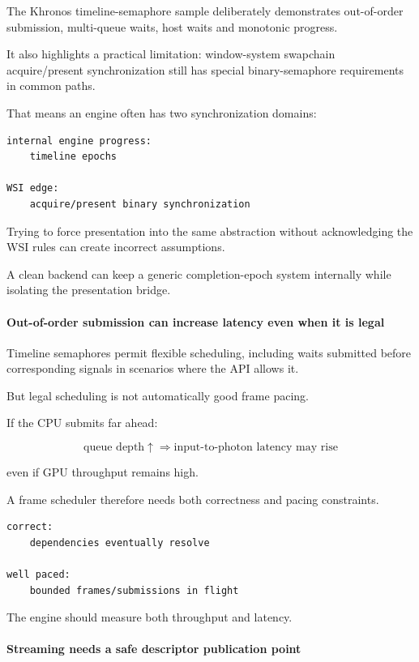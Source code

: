 The Khronos timeline-semaphore sample deliberately demonstrates out-of-order submission, multi-queue waits, host waits and monotonic progress.

It also highlights a practical limitation: window-system swapchain acquire/present synchronization still has special binary-semaphore requirements in common paths.

That means an engine often has two synchronization domains:

\begin{verbatim}
internal engine progress:
    timeline epochs

WSI edge:
    acquire/present binary synchronization
\end{verbatim}

Trying to force presentation into the same abstraction without acknowledging the WSI rules can create incorrect assumptions.

A clean backend can keep a generic completion-epoch system internally while isolating the presentation bridge.

\paragraph{Out-of-order submission can increase latency even when it is legal}\label{out-of-order-submission-can-increase-latency-even-when-it-is-legal}

Timeline semaphores permit flexible scheduling, including waits submitted before corresponding signals in scenarios where the API allows it.

But legal scheduling is not automatically good frame pacing.

If the CPU submits far ahead:

\[
\text{queue depth}\uparrow
\Rightarrow
\text{input-to-photon latency may rise}
\]

even if GPU throughput remains high.

A frame scheduler therefore needs both correctness and pacing constraints.

\begin{verbatim}
correct:
    dependencies eventually resolve

well paced:
    bounded frames/submissions in flight
\end{verbatim}

The engine should measure both throughput and latency.

\paragraph{Streaming needs a safe descriptor publication point}\label{streaming-needs-a-safe-descriptor-publication-point}


